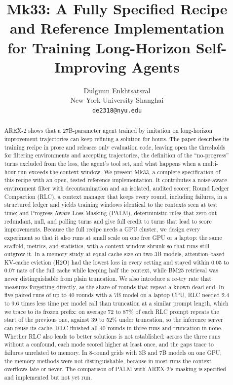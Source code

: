 \documentclass[11pt]{article}
\title{\Large\textbf{Mk33: A Fully Specified Recipe and Reference Implementation\\for Training Long-Horizon Self-Improving Agents}}
\author{Dulguun Enkhtsatsral\\New York University Shanghai\\\texttt{de2318@nyu.edu}}
\date{}
\begin{document}
\maketitle

\begin{abstract}
AREX-2 shows that a 27B-parameter agent trained by imitation on long-horizon improvement trajectories can keep refining a solution for hours. The paper describes its training recipe in prose and releases only evaluation code, leaving open the thresholds for filtering environments and accepting trajectories, the definition of the ``no-progress'' turns excluded from the loss, the agent's tool set, and what happens when a multi-hour run exceeds the context window. We present Mk33, a complete specification of this recipe with an open, tested reference implementation. It contributes a noise-aware environment filter with decontamination and an isolated, audited scorer; Round Ledger Compaction (RLC), a context manager that keeps every round, including failures, in a structured ledger and yields training windows identical to the contexts seen at test time; and Progress-Aware Loss Masking (PALM), deterministic rules that zero out redundant, null, and polling turns and give full credit to turns that lead to score improvements. Because the full recipe needs a GPU cluster, we design every experiment so that it also runs at small scale on one free GPU or a laptop: the same scaffold, metrics, and statistics, with a context window shrunk so that runs still outgrow it. In a memory study at equal cache size on two 3B models, attention-based KV-cache eviction (H2O) had the lowest loss in every setting and stayed within 0.05 to 0.07 nats of the full cache while keeping half the context, while BM25 retrieval was never distinguishable from plain truncation. We also introduce a re-try rate that measures forgetting directly, as the share of rounds that repeat a known dead end. In five paired runs of up to 40 rounds with a 7B model on a laptop CPU, RLC needed 2.4 to 9.6 times less time per model call than truncation at a similar prompt length, which we trace to its frozen prefix: on average 72 to 87\% of each RLC prompt repeats the start of the previous one, against 39 to 52\% under truncation, so the inference server can reuse its cache. RLC finished all 40 rounds in three runs and truncation in none. Whether RLC also leads to better solutions is not established: across the three runs without a confound, each mode scored higher at least once, and the gaps trace to failures unrelated to memory. In 8-round grids with 3B and 7B models on one GPU, the memory methods were not distinguishable, because in most runs the context overflows late or never. The comparison of PALM with AREX-2's masking is specified and implemented but not yet run.
\end{abstract}
\end{document}

